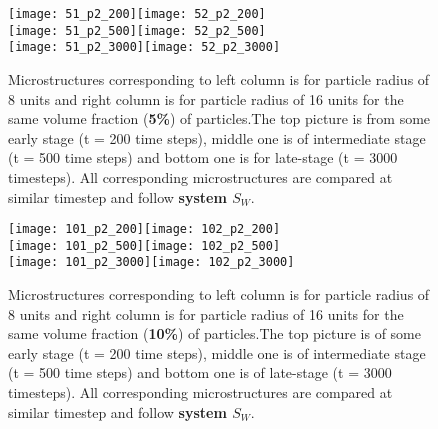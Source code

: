 \documentclass[12pt]{iiscthes}
\theoremstyle{definition}
\theoremstyle{definition}
\theoremstyle{remark}
\begin{document}
\begin{figure}[H]
\begin{center}
\texttt{[image: 51\_p2\_200]}\texttt{[image: 52\_p2\_200]}\\
\texttt{[image: 51\_p2\_500]}\texttt{[image: 52\_p2\_500]}\\
\texttt{[image: 51\_p2\_3000]}\texttt{[image: 52\_p2\_3000]}\\
\caption{Microstructures corresponding to left column is for particle radius of 8 units and right column is for particle radius of 16 units for the same volume fraction (\textbf{5\%}) of particles.The top picture is from some early stage (t = 200 time steps), middle one is of intermediate stage (t = 500 time steps) and bottom one is for late-stage (t = 3000 timesteps). All corresponding microstructures are compared at similar timestep and follow \textbf{system $S_W$}.}\label{512_p2}
\end{center}
\end{figure}
\begin{figure}[H]
\begin{center}
\texttt{[image: 101\_p2\_200]}\texttt{[image: 102\_p2\_200]}\\
\texttt{[image: 101\_p2\_500]}\texttt{[image: 102\_p2\_500]}\\
\texttt{[image: 101\_p2\_3000]}\texttt{[image: 102\_p2\_3000]}\\
\caption{Microstructures corresponding to left column is for particle radius of 8 units and right column is for particle radius of 16 units for the same volume fraction (\textbf{10\%}) of particles.The top picture is of some early stage (t = 200 time steps), middle one is of intermediate stage (t = 500 time steps) and bottom one is of late-stage (t = 3000 timesteps). All corresponding microstructures are compared at similar timestep and follow \textbf{system $S_W$}.}\label{1012_p2}
\end{center}
\end{figure}
\end{document}
